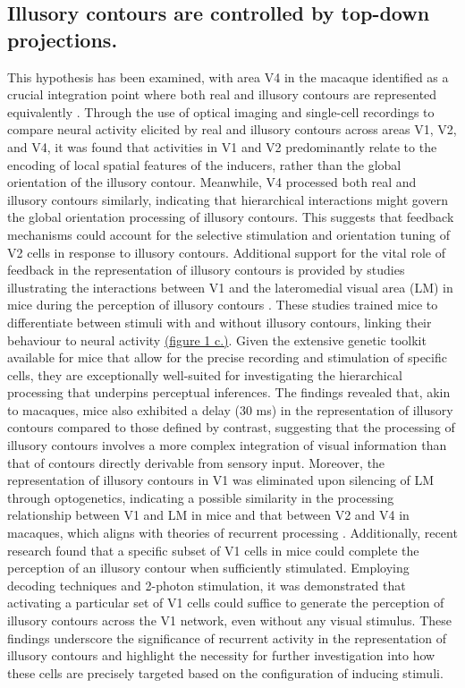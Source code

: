 \documentclass[12pt]{article}
\begin{document}
\subsection{Illusory contours are controlled by top-down projections.}
This hypothesis has been examined, with area V4 in the macaque identified as a crucial integration point where both real and illusory contours are represented equivalently \autocite{panEquivalentRepresentationReal2012}. Through the use of optical imaging and single-cell recordings to compare neural activity elicited by real and illusory contours across areas V1, V2, and V4, it was found that activities in V1 and V2 predominantly relate to the encoding of local spatial features of the inducers, rather than the global orientation of the illusory contour. Meanwhile, V4 processed both real and illusory contours similarly, indicating that hierarchical interactions might govern the global orientation processing of illusory contours. This suggests that feedback mechanisms could account for the selective stimulation and orientation tuning of V2 cells in response to illusory contours. Additional support for the vital role of feedback in the representation of illusory contours is provided by studies illustrating the interactions between V1 and the lateromedial visual area (LM) in mice during the perception of illusory contours \autocite{pakTopDownFeedbackControls2020}. These studies trained mice to differentiate between stimuli with and without illusory contours, linking their behaviour to neural activity \hyperref[fig:figure_1]{(figure 1 c.)}. Given the extensive genetic toolkit available for mice that allow for the precise recording and stimulation of specific cells, they are exceptionally well-suited for investigating the hierarchical processing that underpins perceptual inferences. The findings revealed that, akin to macaques, mice also exhibited a delay (30 ms) in the representation of illusory contours compared to those defined by contrast, suggesting that the processing of illusory contours involves a more complex integration of visual information than that of contours directly derivable from sensory input. Moreover, the representation of illusory contours in V1 was eliminated upon silencing of LM through optogenetics, indicating a possible similarity in the processing relationship between V1 and LM in mice and that between V2 and V4 in macaques, which aligns with theories of recurrent processing \autocite{wyatteEarlyRecurrentFeedback2014}. Additionally, recent research \cite{shinRecurrentPatternCompletion2023} found that a specific subset of V1 cells in mice could complete the perception of an illusory contour when sufficiently stimulated. Employing decoding techniques and 2-photon stimulation, it was demonstrated that activating a particular set of V1 cells could suffice to generate the perception of illusory contours across the V1 network, even without any visual stimulus. These findings underscore the significance of recurrent activity in the representation of illusory contours and highlight the necessity for further investigation into how these cells are precisely targeted based on the configuration of inducing stimuli. 
\end{document}
